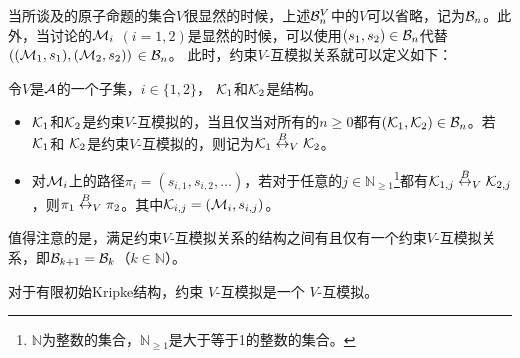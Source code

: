 当所谈及的原子命题的集合$V$很显然的时候，上述${\cal B}_n^V$中的$V$可以省略，记为${\cal B}_n$。此外，当讨论的${\cal M}_i$ $(i=1,2)$是显然的时候，可以使用$(s_1,s_2) \in {\cal B}_n$代替$(({\cal M}_1,s_1),({\cal M}_2,s_2))$ $\in {\cal B}_n$。
此时，约束$V$-互模拟关系就可以定义如下：
\begin{definition}[约束$V$-互模拟]\label{def:V-bisimulation}
	令$V$是${\cal A}$的一个子集，$i\in \{1,2\}$， ${\cal K}_1$和${\cal K}_2$是结构。
	\begin{itemize}
		\item ${\cal K}_1$和${\cal K}_2$是约束$V$-互模拟的，当且仅当对所有的$n \ge 0$都有$({\cal K}_1, {\cal K}_2)\in {\cal B}_n$。若 ${\cal K}_1$和 ${\cal K}_2$是约束$V$-互模拟的，则记为${\cal K}_1 \overset{B}{\leftrightarrow}_V {\cal K}_2$。
		\item 对${\cal M}_i$上的路径$\pi_i=(s_{i,1},s_{i,2},\dots)$，若对于任意的$j\in \mathbb{N}_{\ge 1}$\footnote{$\mathbb{N}$为整数的集合，$\mathbb{N}_{\ge 1}$是大于等于1的整数的集合。}都有${\cal K}_{1,j} \overset{B}{\leftrightarrow}_V {\cal K}_{2,j}$，则$\pi_1 \overset{B}{\leftrightarrow}_V \pi_2$。其中${\cal K}_{i, j}=({\cal M}_i, s_{i,j})$。
	\end{itemize}
\end{definition}

值得注意的是，满足约束$V$-互模拟关系的结构之间有且仅有一个约束$V$-互模拟关系，即${\cal B}_{k+1} = {\cal B}_k$（$k \in \mathbb{N}$）。


\begin{lemma} \label{lem:HbBis}
	对于有限初始Kripke结构，约束 $V$-互模拟是一个 $V$-互模拟。
\end{lemma}

